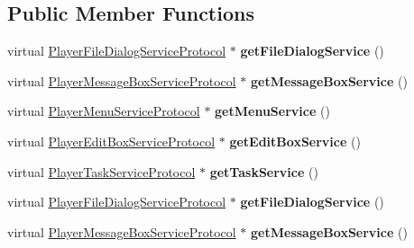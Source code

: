 \subsection*{Public Member Functions}
\begin{DoxyCompactItemize}
\item 
\mbox{\label{classPlayerMac_a744940792ad2323dd4de4a3b66ceb064}} 
virtual \hyperlink{classPlayerFileDialogServiceProtocol}{Player\+File\+Dialog\+Service\+Protocol} $\ast$ {\bfseries get\+File\+Dialog\+Service} ()
\item 
\mbox{\label{classPlayerMac_ab0caa184d6ebc5cfb7fa0f32a8949b63}} 
virtual \hyperlink{classPlayerMessageBoxServiceProtocol}{Player\+Message\+Box\+Service\+Protocol} $\ast$ {\bfseries get\+Message\+Box\+Service} ()
\item 
\mbox{\label{classPlayerMac_a60a547497f039d60e883dd16b1cfeb4f}} 
virtual \hyperlink{classPlayerMenuServiceProtocol}{Player\+Menu\+Service\+Protocol} $\ast$ {\bfseries get\+Menu\+Service} ()
\item 
\mbox{\label{classPlayerMac_af6a90906fb356c3b032980c9e45e87bc}} 
virtual \hyperlink{classPlayerEditBoxServiceProtocol}{Player\+Edit\+Box\+Service\+Protocol} $\ast$ {\bfseries get\+Edit\+Box\+Service} ()
\item 
\mbox{\label{classPlayerMac_a20fa713b6f87d7f26b2d6e08972236fe}} 
virtual \hyperlink{classPlayerTaskServiceProtocol}{Player\+Task\+Service\+Protocol} $\ast$ {\bfseries get\+Task\+Service} ()
\item 
\mbox{\label{classPlayerMac_a4a889255bc5b10819cd447303dc32ad9}} 
virtual \hyperlink{classPlayerFileDialogServiceProtocol}{Player\+File\+Dialog\+Service\+Protocol} $\ast$ {\bfseries get\+File\+Dialog\+Service} ()
\item 
\mbox{\label{classPlayerMac_ab31e3a6807f22f3d5d574f4228c2f7e2}} 
virtual \hyperlink{classPlayerMessageBoxServiceProtocol}{Player\+Message\+Box\+Service\+Protocol} $\ast$ {\bfseries get\+Message\+Box\+Service} ()
\item 
\mbox{\label{classPlayerMac_a6012231ce7328892cfb81be6b34f4545}} 

\end{DoxyCompactItemize}
